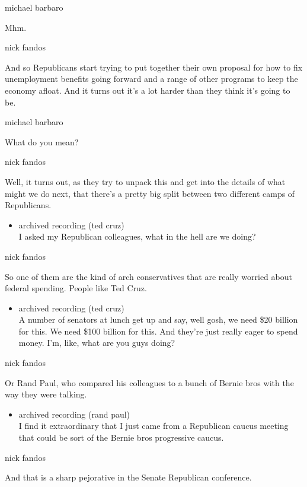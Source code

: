 michael barbaro

Mhm.

nick fandos

And so Republicans start trying to put together their own proposal for
how to fix unemployment benefits going forward and a range of other
programs to keep the economy afloat. And it turns out it's a lot harder
than they think it's going to be.

michael barbaro

What do you mean?

nick fandos

Well, it turns out, as they try to unpack this and get into the details
of what might we do next, that there's a pretty big split between two
different camps of Republicans.

\begin{itemize}
\tightlist
\item
  archived recording (ted cruz)\\
  I asked my Republican colleagues, what in the hell are we doing?
\end{itemize}

nick fandos

So one of them are the kind of arch conservatives that are really
worried about federal spending. People like Ted Cruz.

\begin{itemize}
\tightlist
\item
  archived recording (ted cruz)\\
  A number of senators at lunch get up and say, well gosh, we need \$20
  billion for this. We need \$100 billion for this. And they're just
  really eager to spend money. I'm, like, what are you guys doing?
\end{itemize}

nick fandos

Or Rand Paul, who compared his colleagues to a bunch of Bernie bros with
the way they were talking.

\begin{itemize}
\tightlist
\item
  archived recording (rand paul)\\
  I find it extraordinary that I just came from a Republican caucus
  meeting that could be sort of the Bernie bros progressive caucus.
\end{itemize}

nick fandos

And that is a sharp pejorative in the Senate Republican conference.

